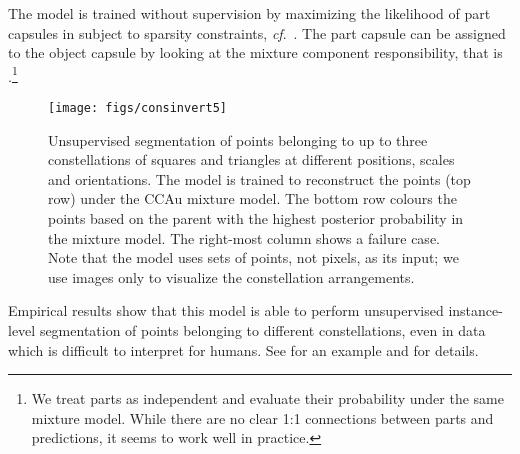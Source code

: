 \documentclass{article}
\begin{document}
The model is trained without supervision by maximizing the likelihood of part capsules in  subject to sparsity constraints, \textit{cf}.\ .
The part capsule  can be assigned to the object capsule  by looking at the mixture component responsibility, that is .\footnote{We treat parts as independent and evaluate their probability under the same mixture model. While there are no clear 1:1 connections between parts and predictions, it seems to work well in practice.}
\begin{figure} 
	\centering
	\begin{minipage}[c]{0.35\linewidth}
		\centering
		\texttt{[image: figs/consinvert5]}
	\end{minipage}
	\hfill
	\begin{minipage}[c]{0.63\linewidth}
		\centering
		\caption{
			Unsupervised segmentation of points belonging to up to three constellations of squares and triangles at different positions, scales and orientations. 
			The model is trained to reconstruct the points (top row) under the \gls{CCAu} mixture model. The bottom row colours the points based on the parent with the highest posterior probability in the mixture model. 
			The right-most column shows a failure case.
			Note that the model uses sets of points, not pixels, as its input; we use images  only to visualize the constellation arrangements.
		}
		\label{fig:constellations}
	\end{minipage}
\end{figure}
Empirical results show that this model is able to perform unsupervised instance-level segmentation of points belonging to different constellations, even in data which is difficult to interpret for humans. See  for an example and  for details.
\end{document}
